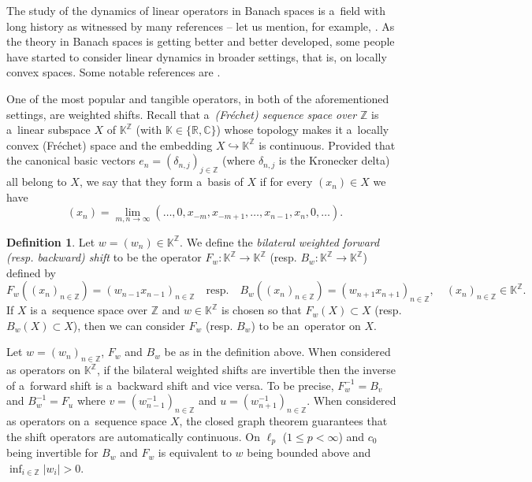 \documentclass[11pt,a4paper]{amsart}
\theoremstyle{definition}
\newtheorem{definition}[theorem]{Definition}
\newcommand{\C}{\mathbb{C}}
\newcommand{\R}{\mathbb{R}}
\newcommand{\Z}{\mathbb{Z}}
\newcommand{\K}{\mathbb{K}}
\begin{document}
	The study of the dynamics of linear operators in Banach spaces is a~field with long history as witnessed by many references -- let us mention, for example,  \cite{Dynamics_of_linear_operators, Linear_Chaos, A_lemma_in_the_theory_of_structural_stability, The_shadowing_lemma_in_the_linear_case}. As the theory in Banach spaces is getting better and better developed, some people have started to consider linear dynamics in broader settings, that is, on locally convex spaces. Some notable references are \cite{Darji, Shadowing_and_chain_rec, Transitive_and_hypercyclic_operators_on_locally_convex_spaces, Weakly_mixing_operators_on_topological_vector_spaces, Hypercyclic_operators_on_topological_vector_spaces}.
	
	One of the most popular and tangible operators, in both of the aforementioned settings, are weighted shifts. Recall that a~\emph{(Fr\'echet) sequence space over $\Z$} is a~linear subspace $X$ of $\K^\Z$ (with $\K \in \{\R, \C\}$) whose topology makes it a~locally convex (Fr\'echet) space and the embedding $X \hookrightarrow \K^\Z$ is continuous. Provided that the canonical basic vectors $e_n = (\delta_{n,j})_{j \in \Z}$ (where $\delta_{n,j}$ is the Kronecker delta) all belong to $X$, we say that they form a~basis of $X$ if for every $(x_n) \in X$ we have
	\begin{equation*}
		(x_n) = \lim_{m,n \to \infty} (\dots, 0, x_{-m}, x_{-m+1}, \dots, x_{n-1}, x_n, 0, \dots).
	\end{equation*}
	\begin{definition}
		Let $w = (w_n) \in \K^\Z$. We define the \emph{bilateral weighted forward (resp. backward) shift} to be the operator $F_w: \K^\Z \to \K^\Z$ (resp. $B_w: \K^\Z \to \K^\Z$) defined by
		\begin{equation*}
			F_w((x_n)_{n\in\Z}) = (w_{n-1}x_{n-1})_{n\in\Z}
			\quad \text{resp.} \quad
			B_w((x_n)_{n\in\Z}) = (w_{n+1}x_{n+1})_{n\in\Z},
			\quad (x_n)_{n\in\Z} \in \K^\Z.
		\end{equation*}
		If $X$ is a~sequence space over $\Z$ and $w \in \K^{\Z}$ is chosen so that $F_w(X) \subset X$ (resp. $B_w(X) \subset X$), then we can consider $F_w$ (resp. $B_w$) to be an~operator on $X$.
	\end{definition}
	
	Let $w = (w_n)_{n\in\Z}$, $F_w$ and $B_w$ be as in the definition above. When considered as operators on $\K^\Z$, if the bilateral weighted shifts are invertible then the inverse of a~forward shift is a~backward shift and vice versa. To be precise, $F_w^{-1} = B_v$ and $B_w^{-1} = F_u$ where $v = (w^{-1}_{n-1})_{n\in\Z}$ and $u = (w^{-1}_{n+1})_{n\in\Z}$. When considered as operators on a~sequence space $X$, the closed graph theorem guarantees that the shift operators are automatically continuous. On \(\ell_p\) (\(1\leq p < \infty\)) and \(c_0\) being invertible for \(B_w\) and \(F_w\) is equivalent to \(w\) being bounded above and \(\inf_{i \in \Z}|w_i| >0\).
	
\end{document}
